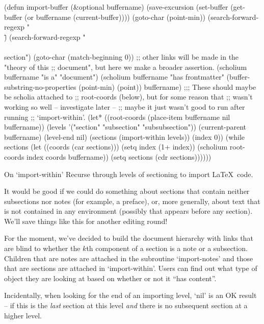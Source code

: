 \begin{elisp}
(defun import-buffer (&optional buffername)
  (save-excursion
    (set-buffer (get-buffer (or buffername
                                (current-buffer))))
    (goto-char (point-min))
    (search-forward-regexp "\\\")
    (search-forward-regexp "\\\\section")
    (goto-char (match-beginning 0))
    ;; other links will be made in the "theory of this
    ;; document", but here we make a broader assertion.
    (scholium buffername "is a" "document")
    (scholium buffername
              "has frontmatter"
              (buffer-substring-no-properties
               (point-min)
               (point))
              buffername)
    ;;; These should maybe be scholia attached to
    ;; root-coords (below), but for some reason that
    ;; wasn't working so well -- investigate later --
    ;; maybe it just wasn't good to run after running
    ;; `import-within'.
    (let* ((root-coords (place-item buffername nil
                                    buffername))
           (levels
            '("section" "subsection" "subsubsection"))
           (current-parent buffername)
           (level-end nil)
           (sections (import-within levels))
           (index 0))
      (while sections
        (let ((coords (car sections)))
          (setq index (1+ index))
          (scholium root-coords
                    index
                    coords
                    buffername))
        (setq sections (cdr sections))))))
\end{elisp}

\begin{notate}{On `import-within'}
Recurse through levels of sectioning to import
\LaTeX\ code.

It would be good if we could do something about sections
that contain neither subsections nor notes (for example, a
preface), or, more generally, about text that is not
contained in any environment (possibly that appears before
any section).  We'll save things like this for another
editing round!

For the moment, we've decided to build the document
hierarchy with links that are blind to whether the $k$th
component of a section is a note or a subsection.
Children that are notes are attached in the subroutine
`import-notes' and those that are sections are attached in
`import-within'.  Users can find out what type of object
they are looking at based on whether or not it ``has
content''.

Incidentally, when looking for the end of an importing
level, `nil' is an OK result -- if this is the \emph{last}
section at this level \emph{and} there is no subsequent
section at a higher level.
\end{notate}

